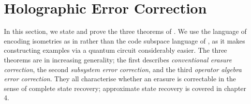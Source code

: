 \documentclass[12pt,a4paper]{report}
\numberwithin{equation}{section}
\theoremstyle{definition}
\theoremstyle{theorem}
\theoremstyle{theorem}
\theoremstyle{example}
\theoremstyle{definition}
\begin{document}

\chapter{Holographic Error Correction}

In this section, we state and prove the three theorems of \cite{Harlow}. We use the language of encoding isometries as in \cite{Pollack} rather than the code subspace language of \cite{Harlow}, as it makes constructing examples via a quantum circuit considerably easier. The three theorems are in increasing generality; the first describes \textit{conventional erasure correction}, the second \textit{subsystem error correction}, and the third \textit{operator algebra error correction}. They all characterise whether an erasure is correctable in the sense of complete state recovery; approximate state recovery is covered in chapter 4.
\end{document}
